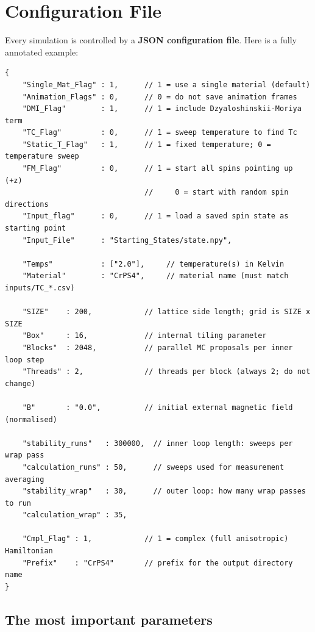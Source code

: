 \documentclass[12pt,a4paper]{article}
\begin{document}
\section{Configuration File}

Every simulation is controlled by a \textbf{JSON configuration file}. Here is
a fully annotated example:

\begin{lstlisting}[style=json, caption={Annotated configuration file}]
{
    "Single_Mat_Flag" : 1,      // 1 = use a single material (default)
    "Animation_Flags" : 0,      // 0 = do not save animation frames
    "DMI_Flag"        : 1,      // 1 = include Dzyaloshinskii-Moriya term
    "TC_Flag"         : 0,      // 1 = sweep temperature to find Tc
    "Static_T_Flag"   : 1,      // 1 = fixed temperature; 0 = temperature sweep
    "FM_Flag"         : 0,      // 1 = start all spins pointing up (+z)
                                //     0 = start with random spin directions
    "Input_flag"      : 0,      // 1 = load a saved spin state as starting point
    "Input_File"      : "Starting_States/state.npy",

    "Temps"           : ["2.0"],     // temperature(s) in Kelvin
    "Material"        : "CrPS4",     // material name (must match inputs/TC_*.csv)

    "SIZE"    : 200,            // lattice side length; grid is SIZE x SIZE
    "Box"     : 16,             // internal tiling parameter
    "Blocks"  : 2048,           // parallel MC proposals per inner loop step
    "Threads" : 2,              // threads per block (always 2; do not change)

    "B"       : "0.0",          // initial external magnetic field (normalised)

    "stability_runs"   : 300000,  // inner loop length: sweeps per wrap pass
    "calculation_runs" : 50,      // sweeps used for measurement averaging
    "stability_wrap"   : 30,      // outer loop: how many wrap passes to run
    "calculation_wrap" : 35,

    "Cmpl_Flag" : 1,            // 1 = complex (full anisotropic) Hamiltonian
    "Prefix"    : "CrPS4"       // prefix for the output directory name
}
\end{lstlisting}

\subsection{The most important parameters}
\end{document}
